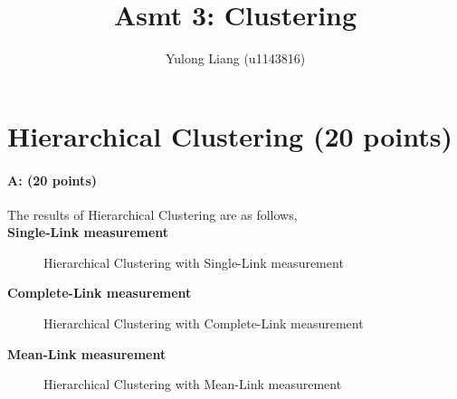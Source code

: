 \documentclass[11pt]{article}
\title{Asmt 3: Clustering}
\author{Yulong Liang (u1143816)}
\begin{document}
\maketitle

\section{Hierarchical Clustering (20 points)}

\paragraph{A: (20 points)} 
The results of Hierarchical Clustering are as follows,\\

\textbf{Single-Link measurement}
\begin{figure}[H]
\caption{Hierarchical Clustering with Single-Link measurement}
\label{fig:name}
\end{figure}

\textbf{Complete-Link measurement}
\begin{figure}[H]
\caption{Hierarchical Clustering with Complete-Link measurement}
\label{fig:name}
\end{figure}

\newpage

\textbf{Mean-Link measurement}
\begin{figure}[H]
\caption{Hierarchical Clustering with Mean-Link measurement}
\label{fig:name}
\end{figure}
\end{document}
